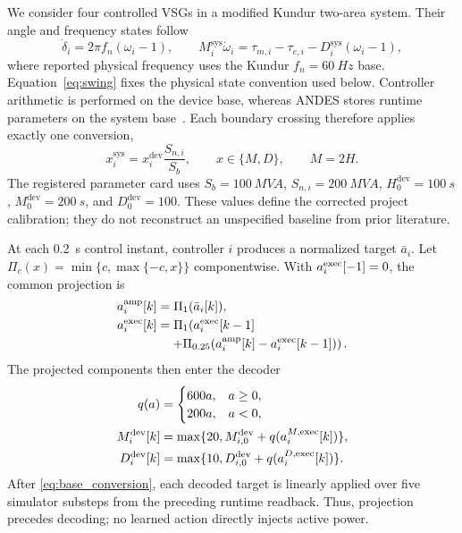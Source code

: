 \documentclass[conference,a4paper]{IEEEtran}
\begin{document}
We consider four controlled VSGs in a modified Kundur two-area system. Their
angle and frequency states follow
\begin{equation}
\dot{\delta}_i=2\pi f_n(\omega_i-1),\qquad
M_i^{\mathrm{sys}}\dot{\omega}_i
=\tau_{m,i}-\tau_{e,i}-D_i^{\mathrm{sys}}(\omega_i-1),
\label{eq:swing}
\end{equation}
where reported physical frequency uses the Kundur $f_n=\SI{60}{Hz}$ base.
Equation~\eqref{eq:swing} fixes the physical state convention used below.
Controller arithmetic is performed on the device base, whereas ANDES stores
runtime parameters on the system base~\cite{cui2021andes}. Each boundary
crossing therefore applies exactly one conversion,
\begin{equation}
x_i^{\mathrm{sys}}=x_i^{\mathrm{dev}}\frac{S_{n,i}}{S_b},
\qquad x\in\{M,D\},\qquad M=2H .
\label{eq:base_conversion}
\end{equation}
The registered parameter card uses $S_b=\SI{100}{MVA}$,
$S_{n,i}=\SI{200}{MVA}$, $H_0^{\mathrm{dev}}=\SI{100}{s}$,
$M_0^{\mathrm{dev}}=\SI{200}{s}$, and $D_0^{\mathrm{dev}}=100$.
These values define the corrected project calibration; they do not reconstruct
an unspecified baseline from prior literature.

At each \SI{0.2}{s} control instant, controller $i$ produces a normalized
target $\bar a_i$. Let $\Pi_c(x)=\min\{c,\max\{-c,x\}\}$ componentwise. With
$a^{\rm exec}_i[-1]=0$, the common projection is
\begin{equation}
\begin{aligned}
a_i^{\rm amp}[k]&=\Pi_1(\bar a_i[k]),\\
a_i^{\rm exec}[k]&=\Pi_1\!\left(a_i^{\rm exec}[k-1]\right.\\
&\quad\left.+\Pi_{0.25}\!\left(a_i^{\rm amp}[k]
-a_i^{\rm exec}[k-1]\right)\right).
\end{aligned}
\label{eq:projection}
\end{equation}
The projected components then enter the decoder
\begin{equation}
\begin{aligned}
q(a)&=\begin{cases}600a,&a\geq0,\\200a,&a<0,\end{cases}\\
M_i^{\mathrm{dev}}[k]&=\max\{20,M_{i,0}^{\mathrm{dev}}+q(a_i^{M,{\rm exec}}[k])\},\\
D_i^{\mathrm{dev}}[k]&=\max\{10,D_{i,0}^{\mathrm{dev}}+q(a_i^{D,{\rm exec}}[k])\}.
\end{aligned}
\label{eq:action_map}
\end{equation}
After \eqref{eq:base_conversion}, each decoded target is linearly applied over
five simulator substeps from the preceding runtime readback. Thus, projection
precedes decoding; no learned action directly injects active power.
\end{document}

